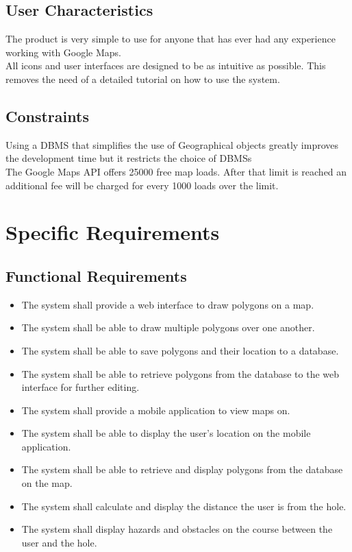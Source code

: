 \documentclass{article}
\begin{document}
    \subsection{User Characteristics}
    The product is very simple to use for anyone that has ever had any
    experience working with Google Maps.\\ All icons and user interfaces are
    designed to be as intuitive as possible. This removes the need of a detailed
    tutorial on how to use the system.

    \subsection{Constraints}
    Using a DBMS that simplifies the use of Geographical objects greatly
    improves the development time but it restricts the choice of DBMSs\\ The
    Google Maps API offers 25000 free map loads. After that limit is reached an
    additional fee will be charged for every 1000 loads over the limit.

    \newpage

    \section{Specific Requirements}

    \subsection{Functional Requirements}
    \begin{itemize}
        \item
            The system shall provide a web interface to draw polygons on a map.
        \item
            The system shall be able to draw multiple polygons over one another.
        \item
            The system shall be able to save polygons and their location to a
            database.
        \item
            The system shall be able to retrieve polygons from the database to
            the web interface for further editing.
        \item
            The system shall provide a mobile application to view maps on.
        \item
            The system shall be able to display the user's location on the
            mobile application.
        \item
            The system shall be able to retrieve and display polygons from the
            database on the map.
        \item
            The system shall calculate and display the distance the user is from
            the hole.
        \item
            The system shall display hazards and obstacles on the course between
            the user and the hole.
    \end{itemize}
\end{document}
